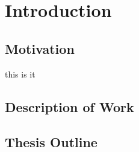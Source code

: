 \chapter{Introduction}


\section{Motivation}
this is it\cite{EU-cybersecurity-act}


\section{Description of Work}


\section{Thesis Outline}
